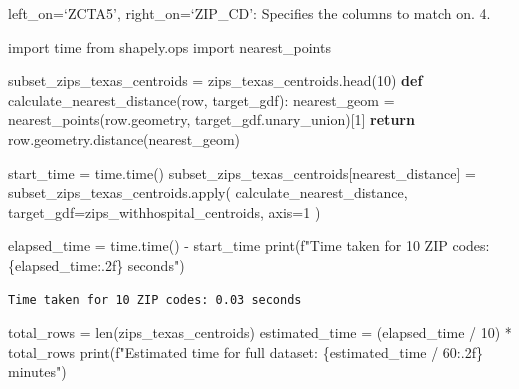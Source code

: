 \documentclass[
  letterpaper,
  DIV=11,
  numbers=noendperiod]{scrartcl}
\newenvironment{Shaded}{\begin{snugshade}}{\end{snugshade}}
\newcommand{\BuiltInTok}[1]{\textcolor[rgb]{0.00,0.23,0.31}{#1}}
\newcommand{\ControlFlowTok}[1]{\textcolor[rgb]{0.00,0.23,0.31}{\textbf{#1}}}
\newcommand{\DecValTok}[1]{\textcolor[rgb]{0.68,0.00,0.00}{#1}}
\newcommand{\ImportTok}[1]{\textcolor[rgb]{0.00,0.46,0.62}{#1}}
\newcommand{\KeywordTok}[1]{\textcolor[rgb]{0.00,0.23,0.31}{\textbf{#1}}}
\newcommand{\NormalTok}[1]{\textcolor[rgb]{0.00,0.23,0.31}{#1}}
\newcommand{\OperatorTok}[1]{\textcolor[rgb]{0.37,0.37,0.37}{#1}}
\newcommand{\SpecialCharTok}[1]{\textcolor[rgb]{0.37,0.37,0.37}{#1}}
\newcommand{\SpecialStringTok}[1]{\textcolor[rgb]{0.13,0.47,0.30}{#1}}
\newcommand{\StringTok}[1]{\textcolor[rgb]{0.13,0.47,0.30}{#1}}
\begin{document}
left\_on=`ZCTA5', right\_on=`ZIP\_CD': Specifies the columns to match
on. 4.

\begin{Shaded}
\begin{Highlighting}[]
\ImportTok{import}\NormalTok{ time}
\ImportTok{from}\NormalTok{ shapely.ops }\ImportTok{import}\NormalTok{ nearest\_points}

\NormalTok{subset\_zips\_texas\_centroids }\OperatorTok{=}\NormalTok{ zips\_texas\_centroids.head(}\DecValTok{10}\NormalTok{)}
\KeywordTok{def}\NormalTok{ calculate\_nearest\_distance(row, target\_gdf):}
\NormalTok{    nearest\_geom }\OperatorTok{=}\NormalTok{ nearest\_points(row.geometry, target\_gdf.unary\_union)[}\DecValTok{1}\NormalTok{]}
    \ControlFlowTok{return}\NormalTok{ row.geometry.distance(nearest\_geom)}

\NormalTok{start\_time }\OperatorTok{=}\NormalTok{ time.time()}
\NormalTok{subset\_zips\_texas\_centroids[}\StringTok{\textquotesingle{}nearest\_distance\textquotesingle{}}\NormalTok{] }\OperatorTok{=}\NormalTok{ subset\_zips\_texas\_centroids.}\BuiltInTok{apply}\NormalTok{(}
\NormalTok{    calculate\_nearest\_distance, target\_gdf}\OperatorTok{=}\NormalTok{zips\_withhospital\_centroids, axis}\OperatorTok{=}\DecValTok{1}
\NormalTok{)}

\NormalTok{elapsed\_time }\OperatorTok{=}\NormalTok{ time.time() }\OperatorTok{{-}}\NormalTok{ start\_time}
\BuiltInTok{print}\NormalTok{(}\SpecialStringTok{f"Time taken for 10 ZIP codes: }\SpecialCharTok{\{}\NormalTok{elapsed\_time}\SpecialCharTok{:.2f\}}\SpecialStringTok{ seconds"}\NormalTok{)}
\end{Highlighting}
\end{Shaded}

\begin{verbatim}
Time taken for 10 ZIP codes: 0.03 seconds
\end{verbatim}

\begin{Shaded}
\begin{Highlighting}[]
\NormalTok{total\_rows }\OperatorTok{=} \BuiltInTok{len}\NormalTok{(zips\_texas\_centroids)}
\NormalTok{estimated\_time }\OperatorTok{=}\NormalTok{ (elapsed\_time }\OperatorTok{/} \DecValTok{10}\NormalTok{) }\OperatorTok{*}\NormalTok{ total\_rows}
\BuiltInTok{print}\NormalTok{(}\SpecialStringTok{f"Estimated time for full dataset: }\SpecialCharTok{\{}\NormalTok{estimated\_time }\OperatorTok{/} \DecValTok{60}\SpecialCharTok{:.2f\}}\SpecialStringTok{ minutes"}\NormalTok{)}
\end{Highlighting}
\end{Shaded}
\end{document}

